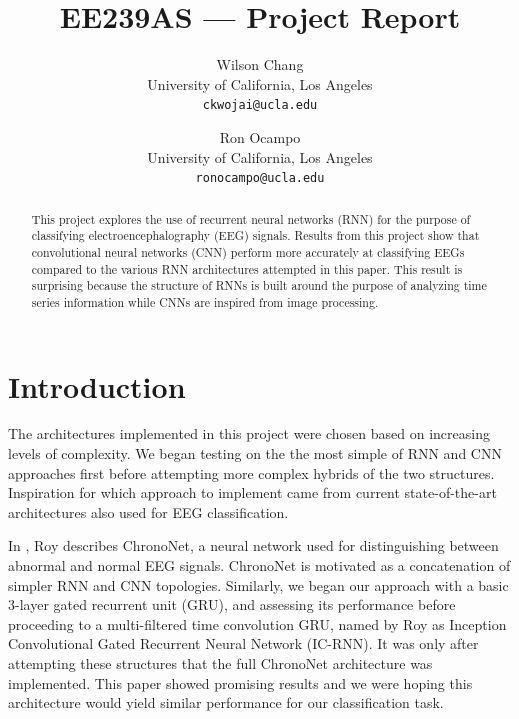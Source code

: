 \documentclass[10pt,twocolumn,letterpaper]{article}
\begin{document}
\title{EE239AS --- Project Report}

\author{Wilson Chang\\
University of California, Los Angeles\\
{\tt\small ckwojai@ucla.edu}
\and
Ron Ocampo\\
University of California, Los Angeles\\
{\tt\small ronocampo@ucla.edu}
}

\maketitle

\begin{abstract}
This project explores the use of recurrent neural networks (RNN) for the purpose of classifying electroencephalography (EEG) signals. Results from this project show that convolutional neural networks (CNN) perform more accurately at classifying EEGs compared to the various RNN architectures attempted in this paper. This result is surprising because the structure of RNNs is built around the purpose of analyzing time series information while CNNs are inspired from image processing. 
 
\end{abstract}

\section{Introduction}
The architectures implemented in this project were chosen based on increasing levels of complexity. We began testing on the the most simple of RNN and CNN approaches first before attempting more complex hybrids of the two structures. Inspiration for which approach to implement came from current state-of-the-art architectures also used for EEG classification.

In \cite{ChronoNet}, Roy describes ChronoNet, a neural network used for distinguishing between abnormal and normal EEG signals. ChronoNet is motivated as a concatenation of simpler RNN and CNN topologies. Similarly, we began our approach with a basic 3-layer gated recurrent unit (GRU), and assessing its performance before proceeding to a multi-filtered time convolution GRU, named by Roy as Inception Convolutional Gated Recurrent Neural Network (IC-RNN). It was only after attempting these structures that the full ChronoNet architecture was implemented. This paper showed promising results and we were hoping this architecture would yield similar performance for our classification task.
\end{document}
